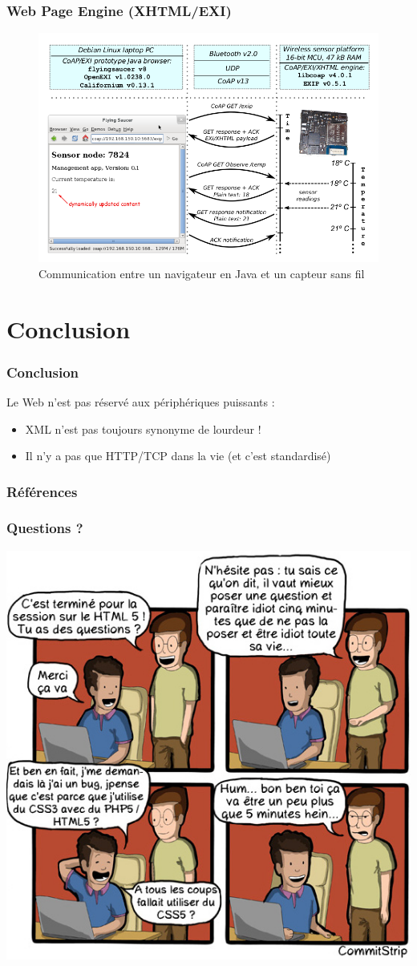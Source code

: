 \documentclass[compress]{beamer}
\begin{document}
\begin{frame}
	\frametitle{Web Page Engine (XHTML/EXI)}
	\begin{figure}[h]
	\includegraphics[width=.8\textwidth]{browser.png}
	\caption{Communication entre un navigateur en Java et
	un capteur sans fil \cite{kyu}}
	\end{figure}
\end{frame}

\section{Conclusion}
\begin{frame}
	\frametitle{Conclusion}
	Le Web n'est pas réservé aux périphériques puissants :
	\begin{itemize}
		\item XML n'est pas toujours synonyme de lourdeur !
		\item Il n'y a pas que HTTP/TCP dans la vie (et c'est standardisé)
	\end{itemize}
\end{frame}

\appendix
\begin{frame}
	\frametitle{Références}
	
\end{frame}

\begin{frame}[t]
	\frametitle{Questions ?}
	\center
	\vspace{-2em}
	\includegraphics[width=.6\textwidth]{questions-html5_commitstrip.jpg}
\end{frame}
\end{document}
